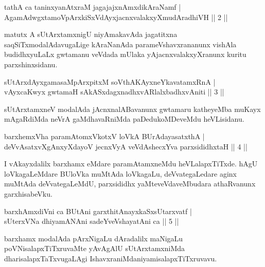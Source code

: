 \begin{shl}
tathA ca taninxyanAtxraM jagajajxnAmxdikAraNamf |\\
AgamAdwgxtamoV\s pArxkiSxVdAyxjacnxvalakxyXmudAradhiVH \hfill || 2 ||
\end{shl}

\begin{artha}
matutx A sUtArxtamxnigU niyAmakavAda jagatitxna saqSiTx\break modalAdavugaLige kAraNanAda parameVshavxrananunx vishAla budidhxyuLaLx gwtamanu veVdada mUlaka yAjacnxvalakxyXranunx kuritu parxshinxsidanu.
\end{artha}

\begin{shl}
sUtArxdAyxgamasaMpArxpitxM soV\s thA\s \s KAyxneYkavatamxRnA |\\
vAyxcaKwyx gwtamaH sAkASxdagxnadhxvARlalxbadhxvAniti \hfill || 3 ||
\end{shl}

\begin{artha}
sUtArxtamxneV modalAda jAcnxnalABavanunx gwtamaru katheyeMba muKayx mAgaRdiMda neVrA gaMdhavaRniMda paDedukoMDeveMdu heVLisidanu.
\end{artha}

\begin{shl}
barxhemxVha paramAtomxVkotxV loVkA BUrAdayasatxthA |\\
deVvAsatxvXgAnxyXdayoV jecnxVyA veVdAshecxYva parxsididhxtaH \hfill || 4 ||
\end{shl}

\begin{artha}
I vAkayxdalilx barxhamx eMdare paramAtamxneMdu heVLalapxTiTxde. hAgU loVkagaLeMdare BUloVka muMtAda loVkagaLu, deVvategaLedare aginx muMtAda deVvategaLeMdU, parxsididhx yaMteveVdaveMbudara athaRvanunx garxhisabeVku.
\end{artha}%


\begin{shl}
barxhAmxdiVni ca BUtAni garxthitAnayxkaSxsUtarxvatf |\\
sUterxVNa dhiyamANAni sadeYveVshayatAni ca \hfill || 5 ||
\end{shl}

\begin{artha}
barxhamx modalAda pArxNigaLu dAradalilx maNigaLu poVNisalapxTiTxru\-vaMte yAvAgAlU sUtArxtamxniMda dharisalapxTaTxvugaLAgi IshavxraniMda\break niyamisalapxTiTxruvavu.
\end{artha}

